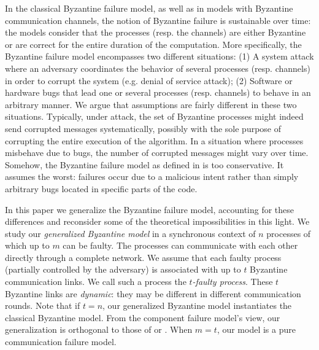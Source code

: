 \documentclass[11pt]{article}
\newcommand{\tmem}[1]{{\em #1\/}}
\begin{document}
In the classical Byzantine failure model, as well as in models with Byzantine communication channels, the notion of Byzantine failure is sustainable over time: the models consider that the processes (resp. the channels) are either Byzantine or are correct for the entire duration of the computation. More specifically, the Byzantine failure model encompasses two different situations: (1) A system attack where an adversary coordinates the behavior of several processes (resp. channels) in order to corrupt the system (e.g. denial of service attack); (2) Software or hardware bugs that lead one or several processes (resp. channels) to behave in an arbitrary manner.
We argue that
assumptions are fairly different in these two situations. Typically, under
attack, the set of Byzantine processes might indeed send corrupted messages systematically, possibly
with the sole purpose of corrupting the entire execution of the algorithm. In a situation where processes misbehave due to bugs, the number of corrupted messages might vary over time. Somehow, the Byzantine failure model as defined in \cite{lamport1982byzantine,pease1980reaching} is too conservative. It assumes the worst: failures occur due to a malicious intent rather than simply arbitrary bugs located in specific parts of the code.

In this paper we generalize the Byzantine failure model, accounting
for these differences and reconsider some of the theoretical impossibilities in
this light. We study our  \tmem{generalized Byzantine model} in a synchronous context
of $n$
processes of which up to $m$ can be faulty. The processes can
communicate with each other directly through a complete network.
We assume that each faulty process (partially controlled by
the adversary) is associated with up to $t$ Byzantine communication
links. We call such a process the
{\tmem{$t$-faulty process}}.
These $t$ Byzantine links are \tmem{dynamic}: they may be
different in different communication rounds.
Note that if $t=n$, our generalized Byzantine model instantiates the classical Byzantine model. From the component failure model's view, our generalization is orthogonal to those of \cite{tseng2013iterative} or \cite{santoro2007agreement}. When $m=t$, our model is a pure communication failure model. 
\end{document}
